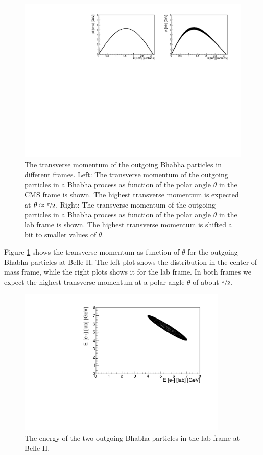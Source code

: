 \documentclass[a4paper,11pt,twosided,final,german,openbib,pdftex,listof=totoc,bibliography=totoc]{scrbook}
\begin{document}
\begin{figure}[h!]
	\centering
	\includegraphics[width=\textwidth]{Bilder/CptTheta}
	\caption[Transverse Momentum As Function Of $\theta$ In The CMS And LAB Frame]{The transverse momentum of the outgoing Bhabha particles in different frames. Left: The transverse momentum of the outgoing particles in a Bhabha process as function of the polar angle $\theta$ in the CMS frame is shown. The highest transverse momentum is expected at $\theta \approx \nicefrac{\pi}{2}$. Right: The transverse momentum of the outgoing particles in a Bhabha process as function of the polar angle $\theta$ in the lab frame is shown. The highest transverse momentum is shifted a bit to smaller values of $\theta$.}
	\label{fig:Belle IItMomentum}
\end{figure}


Figure \ref{fig:Belle IItMomentum} shows the transverse momentum as function of $\theta$ for the outgoing Bhabha particles at Belle II. The left plot shows the distribution in the center-of-mass frame, while the right plots shows it for the lab frame. In both frames we expect the highest transverse momentum at a polar angle $\theta$ of about $\nicefrac{\pi}{2}$.



\begin{figure}[h!]
	\centering
	\includegraphics[width=10cm]{Bilder/ee}
	\caption[Energies Of The Outgoing Particle In The LAB Frame]{The energy of the two outgoing Bhabha particles in the lab frame at Belle II.}
	\label{fig:EvsE}
\end{figure}
\end{document}
